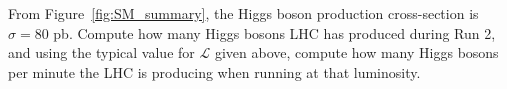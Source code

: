 \begin{mybox}
\begin{ExerciseList}
\Exercise From Figure~\ref{fig:SM_summary}, the Higgs boson production cross-section is $\sigma = 80$ pb. Compute how many Higgs bosons LHC has produced during Run 2, and using the typical value for $\mathcal{L}$ given above, compute how many Higgs bosons per minute the LHC is producing when running at that luminosity. 
\end{ExerciseList}
\end{mybox}
